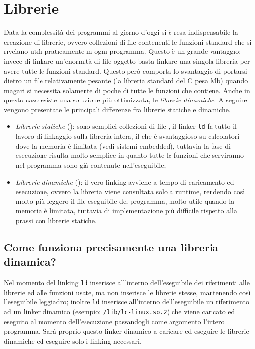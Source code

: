 \documentclass[class=book, crop=false, oneside]{standalone}
\begin{document}
\section{Librerie}
Data la complessità dei programmi al giorno d'oggi si è resa indispensabile la creazione di librerie, ovvero collezioni di file  contenenti le funzioni standard che si rivelano utili praticamente in ogni programma.
Questo è un grande vantaggio: invece di linkare un'enormità di file oggetto basta linkare una singola libreria per avere tutte le funzioni standard. Questo però comporta lo svantaggio di portarsi dietro un file relativamente pesante (la libreria standard del C pesa \unit[2,5]{Mb}) quando magari si necessita solamente di poche di tutte le funzioni che contiene.
Anche in questo caso esiste una soluzione più ottimizzata, le \emph{librerie dinamiche}. A seguire vengono presentate le principali differenze fra librerie statiche e dinamiche.
\begin{itemize}
	\item \emph{Librerie statiche} (): sono semplici collezioni di file , il linker \texttt{ld} fa tutto il lavoro di linkaggio sulla libreria intera, il che è svantaggioso su calcolatori dove la memoria è limitata (vedi sistemi embedded), tuttavia la fase di esecuzione risulta molto semplice in quanto tutte le funzioni che serviranno nel programma sono già contenute nell'eseguibile;
	\item \emph{Librerie dinamiche} (): il vero linking avviene a tempo di caricamento ed esecuzione, ovvero la libreria viene consultata solo a runtime, rendendo così molto più leggero il file eseguibile del programma, molto utile quando la memoria è limitata, tuttavia di implementazione più difficile rispetto alla prassi con librerie statiche.
\end{itemize}

\subsection{Come funziona precisamente una libreria dinamica?}
Nel momento del linking \texttt{ld} inserisce all'interno dell'eseguibile dei riferimenti alle librerie ed alle funzioni usate, ma non inserisce le librerie stesse, mantenendo così l'eseguibile leggiadro; inoltre \texttt{ld} inserisce all'interno dell'eseguibile un riferimento ad un linker dinamico (esempio: \texttt{/lib/ld-linux.so.2}) che viene caricato ed eseguito al momento dell'esecuzione passandogli come argomento l'intero programma. Sarà proprio questo linker dinamico a caricare ed eseguire le librerie dinamiche ed eseguire solo i linking necessari.
\end{document}
